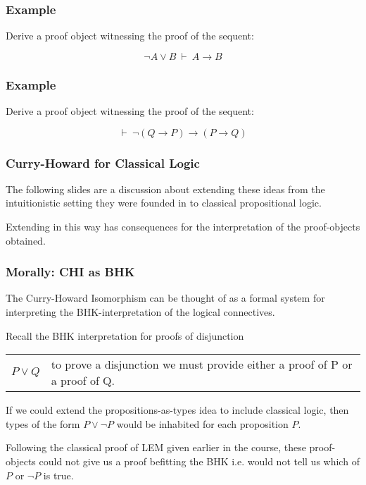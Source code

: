 \documentclass{beamer}
\theoremstyle{indentDefn} \newtheorem{defn}[]{Definition}
\begin{document}
\begin{frame}
  \frametitle{Example}

  Derive a proof object witnessing the proof of the sequent: 

  $$ \lnot A \lor B \ \vdash \ A \to B$$

  \vspace{5cm}

\end{frame}

\begin{frame}
  \frametitle{Example}

  Derive a proof object witnessing the proof of the sequent: 

  $$ \vdash \ \lnot(Q \to P) \to (P \to Q)$$

  \vspace{5cm}

\end{frame}

\begin{frame}
  \frametitle{Curry-Howard for Classical Logic}

  The following slides are a discussion about extending these ideas from the intuitionistic setting they were founded in to classical propositional logic. 

  Extending in this way has consequences for the interpretation of the proof-objects obtained.

\end{frame}

\begin{frame}
  \frametitle{Morally: CHI as BHK}

  The Curry-Howard Isomorphism can be thought of as a formal system for interpreting the BHK-interpretation of the logical connectives. 

  Recall the BHK interpretation for proofs of disjunction 

  \begin{center}
    \begin{tabular}{p{1.5cm}p{8cm}}
      $P \lor Q$ & to prove a disjunction we must provide either a proof of P or a proof of Q. 
    \end{tabular}
  \end{center}

  If we could extend the propositions-as-types idea to include classical logic, then types of the form $P \lor \lnot P$ would be inhabited for each proposition $P$. 

  Following the classical proof of LEM given earlier in the course, these proof-objects could not give us a proof befitting the BHK i.e. would not tell us which of $P$ or $\lnot P$ is true. 

\end{frame}
\end{document}
